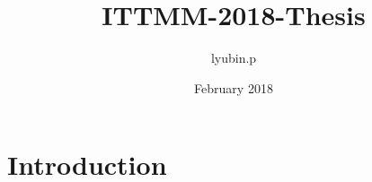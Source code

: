 \documentclass{article}
\title{ITTMM-2018-Thesis}
\author{lyubin.p }
\date{February 2018}
\begin{document}
\maketitle

\section{Introduction}
\end{document}
